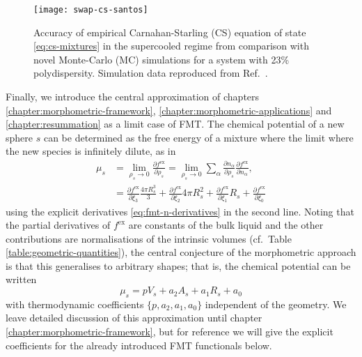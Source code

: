 \begin{SCfigure}
  \texttt{[image: swap-cs-santos]}
  \caption[Accuracy of Carnahan-Starling equation at high densities]{
    Accuracy of empirical Carnahan-Starling (CS) equation of state \eqref{eq:cs-mixtures} in the supercooled regime from comparison with novel Monte-Carlo (MC) simulations for a system with 23\% polydispersity.
    Simulation data reproduced from Ref.\ \cite{BerthierPRL2016}.
  }
  \label{fig:swap-eos}
\end{SCfigure}

Finally, we introduce the central approximation of chapters \ref{chapter:morphometric-framework}, \ref{chapter:morphometric-applications} and \ref{chapter:resummation} as a limit case of FMT.
The chemical potential of a new sphere $s$ can be determined as the free energy of a mixture where the limit where the new species is infinitely dilute, as in
\begin{equation}\label{eq:fmt-morphometric}
  \begin{split}
    \mu_s
    &=
    \lim_{\rho_s \to 0} \frac{\partial f^\mathrm{ex}}{\partial \rho_s}
    =
    \lim_{\rho_s \to 0}
    \sum_\alpha
    \frac{\partial n_\alpha}{\partial \rho_s}
    \frac{\partial f^\mathrm{ex}}{\partial n_\alpha},
    \\ &=
    \frac{\partial f^\mathrm{ex}}{\partial \xi_3} \frac{4 \pi R_s^3}{3}
    + \frac{\partial f^\mathrm{ex}}{\partial \xi_2} 4 \pi R_s^2
    + \frac{\partial f^\mathrm{ex}}{\partial \xi_1} R_s
    + \frac{\partial f^\mathrm{ex}}{\partial \xi_0}
  \end{split}
\end{equation}
using the explicit derivatives \eqref{eq:fmt-n-derivatives} in the second line.
Noting that the partial derivatives of $f^\mathrm{ex}$ are constants of the bulk liquid and the other contributions are normalisations of the intrinsic volumes (cf.\ Table \ref{table:geometric-quantities}), the central conjecture of the morphometric approach is that this generalises to arbitrary shapes; that is, the chemical potential can be written \cite{KonigPRL2004,RothPRL2006}
\begin{equation}\label{eq:fmt-morphometric-2}
  \mu_s = p V_s + a_2 A_s + a_1 R_s + a_0
\end{equation}
with thermodynamic coefficients $\{p, a_2, a_1, a_0\}$ independent of the geometry.
We leave detailed discussion of this approximation until chapter \ref{chapter:morphometric-framework}, but for reference we will give the explicit coefficients for the already introduced FMT functionals below.

